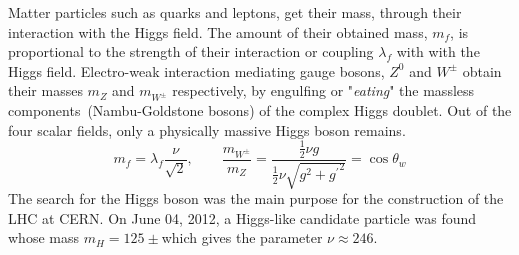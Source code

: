 Matter particles such as quarks and leptons, get their mass, through their interaction with the Higgs field. The amount of their obtained mass, $m_{f}$, is proportional to the strength  of their interaction or  coupling $\lambda_{f}$ with with the Higgs field. Electro-weak interaction mediating gauge bosons, $Z^{0}$ and $W^{\pm}$ obtain their masses $m_{Z}$ and  $m_{W^{\pm}}$ respectively, by engulfing or "\textit{eating}" the massless components~(Nambu-Goldstone bosons) of the complex Higgs doublet. Out of the  four scalar fields, only a physically massive Higgs boson remains.
\begin{equation}
m_{f} = \lambda_{f}\frac{\nu}{\sqrt{2}}, \quad \quad  \frac{m_{W^{\pm}}}{ m_{Z}} = \frac{\frac{1}{2}\nu g}{\frac{1}{2}\nu\sqrt{g^{2} + {g^{\prime}}^{2}}} = \cos\theta_{w}
\end{equation} 
The search for the Higgs boson was the main purpose for the construction of the LHC at CERN.  On June 04, 2012, a Higgs-like candidate particle was found whose mass $m_{H} = 125 \pm  $\GeVc which gives the parameter $\nu \approx 246$\GeV.

